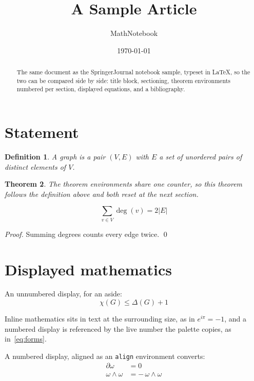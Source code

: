 \documentclass[smallextended]{svjour3}
\newtheorem{theorem}{Theorem}[section]
\newtheorem{definition}[theorem]{Definition}
\theoremstyle{remark}
\begin{document}
\title{A Sample Article}
\author{MathNotebook}
\date{\today}

\maketitle

\begin{abstract}
The same document as the SpringerJournal notebook sample, typeset in LaTeX, so the
two can be compared side by side: title block, sectioning, theorem environments
numbered per section, displayed equations, and a bibliography.
\end{abstract}

\section{Statement}

\begin{definition}
A graph is a pair $(V,E)$ with $E$ a set of unordered pairs of distinct elements of $V$.
\end{definition}

\begin{theorem}
The theorem environments share one counter, so this theorem follows the definition
above and both reset at the next section.
\end{theorem}

\begin{equation}
  \sum_{v \in V} \deg(v) = 2\lvert E \rvert
\end{equation}

\begin{proof}
Summing degrees counts every edge twice. \qed
\end{proof}

\section{Displayed mathematics}

An unnumbered display, for an aside:
\[
  \chi(G) \le \Delta(G) + 1
\]

Inline mathematics sits in text at the surrounding size, as in $e^{i\pi} = -1$, and a
numbered display is referenced by the live number the palette copies, as in~\eqref{eq:forms}.

A numbered display, aligned as an \texttt{align} environment converts:
\begin{align}
  \partial \omega &= 0 \label{eq:forms} \\
  \omega \wedge \omega &= -\, \omega \wedge \omega
\end{align}
\end{document}
